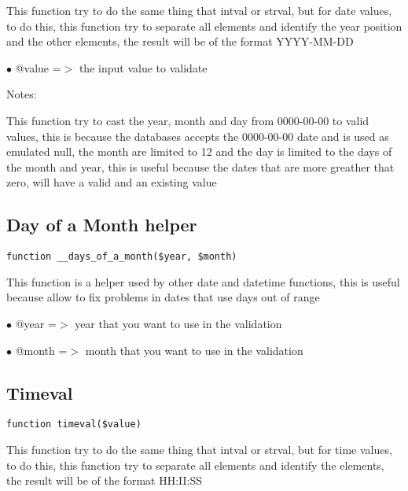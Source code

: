 \documentclass[a4paper]{book}
\begin{document}
This function try to do the same thing that intval or strval, but for date
values, to do this, this function try to separate all elements and identify
the year position and the other elements, the result will be of the format
YYYY-MM-DD

\begin{compactitem}
\item[\color{myblue}$\bullet$] @value =$>$ the input value to validate
\end{compactitem}

Notes:

This function try to cast the year, month and day from 0000-00-00 to valid
values, this is because the databases accepts the 0000-00-00 date and is used
as emulated null, the month are limited to 12 and the day is limited to the
days of the month and year, this is useful because the dates that are more
greather that zero, will have a valid and an existing value

\hypertarget{toc80}{}
\subsection{Day of a Month helper}

\begin{lstlisting}
function __days_of_a_month($year, $month)
\end{lstlisting}

This function is a helper used by other date and datetime functions, this
is useful because allow to fix problems in dates that use days out of range

\begin{compactitem}
\item[\color{myblue}$\bullet$] @year  =$>$ year that you want to use in the validation
\item[\color{myblue}$\bullet$] @month =$>$ month that you want to use in the validation
\end{compactitem}

\hypertarget{toc81}{}
\subsection{Timeval}

\begin{lstlisting}
function timeval($value)
\end{lstlisting}

This function try to do the same thing that intval or strval, but for time
values, to do this, this function try to separate all elements and identify
the elements, the result will be of the format HH:II:SS
\end{document}
